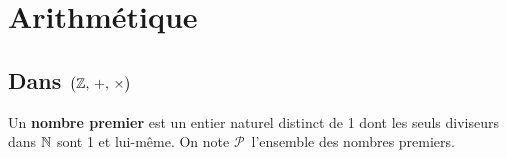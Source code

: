 
\section{Arithmétique}
\vspace{0.8cm}
\subsection{Dans \(\bigl(\mathbb{Z},\,+,\,\times\bigr)\)}

\vspace{1cm}

Un \textbf{nombre premier} est un entier naturel distinct de 1 dont les seuls diviseurs dans $\mathbb{N}$ sont 1 et lui-même. On note $\mathcal{P}\,$ l'ensemble des nombres premiers.

\vspace{1.2cm}

